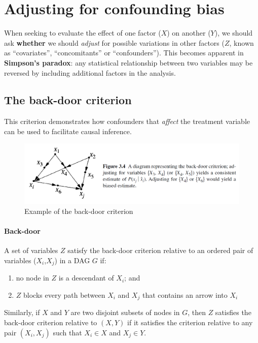 \documentclass[11pt]{article}
\numberwithin{equation}{section}
\begin{document}
\section{Adjusting for confounding bias}

When seeking to evaluate the effect of one factor ($X$) on another ($Y$), we should ask \textbf{whether} we should \textit{adjust} for possible variations in other factors ($Z$, known as ``covariates'', ``concomitants'' or ``confounders''). This becomes apparent in \textbf{Simpson's paradox}: any statistical relationship between two variables may be reversed by including additional factors in the analysis.

\subsection{The back-door criterion}
This criterion demonstrates how confounders that \textit{affect} the treatment variable can be used to facilitate causal inference.

\begin{figure}
\begin{center}
\includegraphics[width=0.8\columnwidth]{figures/back-door.png}  
\end{center}
\caption{Example of the back-door criterion
}
\label{Fig:front_door}
\end{figure}

\paragraph{Back-door} 
A set of variables $Z$ satisfy the back-door criterion relative to an ordered pair of variables ($X_i$,$X_j$) in a DAG $G$ if:
\begin{enumerate}[noitemsep]
\item no node in $Z$ is a descendant of $X_i$; and
\item $Z$ blocks every path between $X_i$ and $X_j$ that contains an arrow into $X_i$
\end{enumerate}
Similarly, if $X$ and $Y$ are two disjoint subsets of nodes in $G$, then $Z$ satisfies the back-door criterion relative to $(X,Y)$ if it satisfies the criterion relative to any pair $(X_i, X_j)$ such that $X_i \in X$ and $X_j \in Y$.
\end{document}
